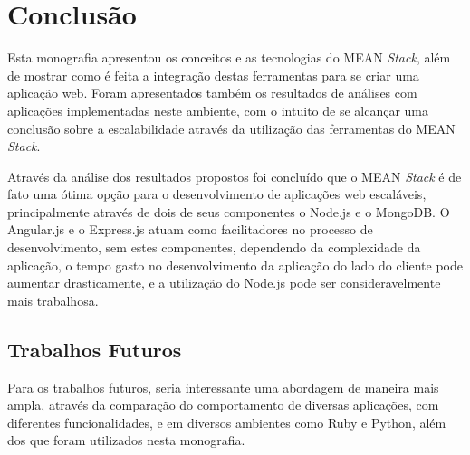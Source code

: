 \chapter{Conclusão}
\label{conclusao}

  Esta monografia apresentou os conceitos e as tecnologias do MEAN \textit{Stack}, além de mostrar como é feita a integração destas ferramentas  para se criar uma aplicação web. Foram apresentados também os resultados de análises com aplicações implementadas neste ambiente, com o intuito de se alcançar uma conclusão sobre a escalabilidade através da utilização das ferramentas do MEAN \textit{Stack}.
  
 Através da análise dos resultados propostos foi concluído que o MEAN \textit{Stack} é de fato uma ótima opção para o desenvolvimento de aplicações web escaláveis, principalmente através de dois de seus componentes o Node.js e o MongoDB. O Angular.js e o Express.js atuam como facilitadores no processo de desenvolvimento, sem estes componentes, dependendo da complexidade da aplicação, o tempo gasto no desenvolvimento da aplicação do lado do cliente pode aumentar drasticamente, e a utilização do Node.js pode ser consideravelmente mais trabalhosa. 
  
   
\section{Trabalhos Futuros}
 Para os trabalhos futuros, seria interessante uma abordagem de maneira mais ampla, através da comparação do comportamento de diversas aplicações, com diferentes funcionalidades, e em diversos ambientes como Ruby e Python, além dos que foram utilizados nesta monografia. 